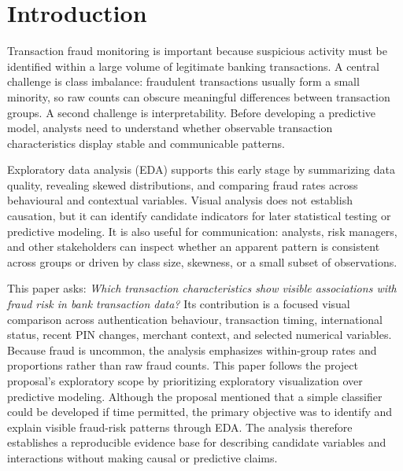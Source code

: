 \documentclass[conference,final,]{IEEEtran}
\begin{document}

%
\IEEEpeerreviewmaketitle


\section{Introduction}\label{introduction}

Transaction fraud monitoring is important because suspicious activity
must be identified within a large volume of legitimate banking
transactions. A central challenge is class imbalance: fraudulent
transactions usually form a small minority, so raw counts can obscure
meaningful differences between transaction groups. A second challenge is
interpretability. Before developing a predictive model, analysts need to
understand whether observable transaction characteristics display stable
and communicable patterns.

Exploratory data analysis (EDA) supports this early stage by summarizing
data quality, revealing skewed distributions, and comparing fraud rates
across behavioural and contextual variables. Visual analysis does not
establish causation, but it can identify candidate indicators for later
statistical testing or predictive modeling. It is also useful for
communication: analysts, risk managers, and other stakeholders can
inspect whether an apparent pattern is consistent across groups or
driven by class size, skewness, or a small subset of observations.

This paper asks: \emph{Which transaction characteristics show visible
associations with fraud risk in bank transaction data?} Its contribution
is a focused visual comparison across authentication behaviour,
transaction timing, international status, recent PIN changes, merchant
context, and selected numerical variables. Because fraud is uncommon,
the analysis emphasizes within-group rates and proportions rather than
raw fraud counts. This paper follows the project proposal's exploratory
scope by prioritizing exploratory visualization over predictive
modeling. Although the proposal mentioned that a simple classifier could
be developed if time permitted, the primary objective was to identify
and explain visible fraud-risk patterns through EDA. The analysis
therefore establishes a reproducible evidence base for describing
candidate variables and interactions without making causal or predictive
claims.
\end{document}
